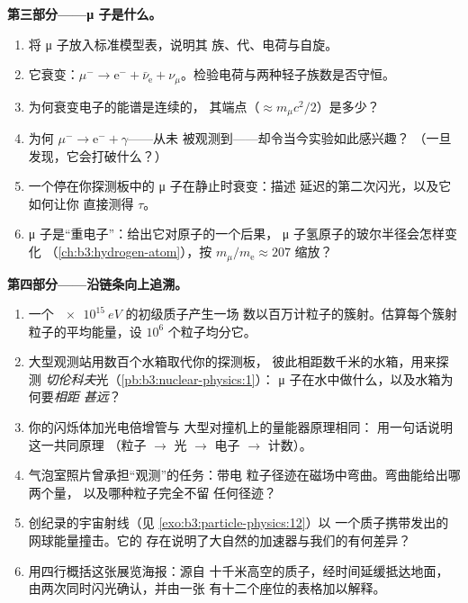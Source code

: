 \begin{problem}
\medskip\noindent\textbf{第三部分——μ 子是什么。}

\begin{enumerate}[resume]
  \item 将 μ 子放入标准模型表，说明其
        族、代、电荷与自旋。
  \item 它衰变：$\mu^- \to \text{e}^- + \bar\nu_{\text{e}} +
        \nu_\mu$。检验电荷与两种轻子族数是否守恒。
  \item 为何衰变电子的能谱是连续的，
        其端点（$\approx m_\mu c^2/2$）是多少？
  \item 为何 $\mu^- \to \text{e}^- + \gamma$——从未
        被观测到——却令当今实验如此感兴趣？
        （一旦发现，它会打破什么？）
  \item 一个停在你探测板中的 μ 子在静止时衰变：描述
        延迟的第二次闪光，以及它如何让你
        直接测得 $\tau$。
  \item μ 子是“重电子”：给出它对原子的一个后果，
        μ 子氢原子的玻尔半径会怎样变化
        （\cref{ch:b3:hydrogen-atom}），按
        $m_\mu/m_{\text{e}} \approx 207$ 缩放？
\end{enumerate}

\medskip\noindent\textbf{第四部分——沿链条向上追溯。}

\begin{enumerate}[resume]
  \item 一个 $\qty{e15}{eV}$ 的初级质子产生一场
        数以百万计粒子的簇射。估算每个簇射
        粒子的平均能量，设 $10^{6}$ 个粒子均分它。
  \item 大型观测站用数百个水箱取代你的探测板，
        彼此相距数千米的水箱，用来探测
        \emph{切伦科夫}光（\cref{pb:b3:nuclear-physics:1}）：
        μ 子在水中做什么，以及水箱为何要\emph{相距
        甚远}？
  \item 你的闪烁体加光电倍增管与
        大型对撞机上的量能器原理相同：
        用一句话说明这一共同原理
        （粒子 $\to$ 光 $\to$ 电子 $\to$ 计数）。
  \item 气泡室照片曾承担“观测”的任务：带电
        粒子径迹在磁场中弯曲。弯曲能给出哪两个量，
        以及哪种粒子完全不留
        任何径迹？
  \item 创纪录的宇宙射线（见
        \cref{exo:b3:particle-physics:12}）以
        一个质子携带发出的网球能量撞击。它的
        存在说明了大自然的加速器与我们的有何差异？
  \item 用四行概括这张展览海报：源自
        十千米高空的质子，经时间延缓抵达地面，
        由两次同时闪光确认，并由一张
        有十二个座位的表格加以解释。
\end{enumerate}
\end{problem}
